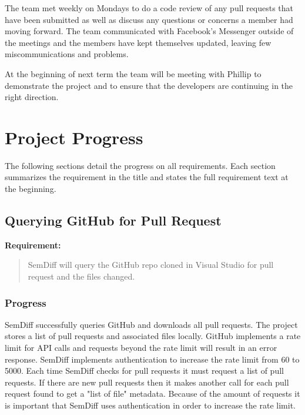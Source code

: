 \documentclass[draftclsnofoot,onecolumn]{IEEEtran}
\begin{document}
The team met weekly on Mondays to do a code review of any pull requests that 
have been submitted as well as discuss any questions or concerns a member had 
moving forward. The team communicated with Facebook's Messenger outside of the 
meetings and the members have kept themselves updated, leaving few 
miscommunications and problems.

At the beginning of next term the team will be meeting with Phillip to 
demonstrate the project and to ensure that the developers are continuing in the 
right direction.

\section{Project Progress}%

The following sections detail the progress on all requirements. Each section 
summarizes the requirement in the title and states the full requirement text at 
the beginning.

\subsection{Querying GitHub for Pull Request}%

\textbf{Requirement:}

\begin{quote}

SemDiff will query the GitHub repo cloned in Visual Studio for pull request 
and the files changed.

\end{quote}

\subsubsection{Progress}

SemDiff successfully queries GitHub and downloads all pull requests. The 
project stores a list of pull requests and associated files locally. GitHub 
implements a rate limit for API calls and requests beyond the rate limit will 
result in an error response. SemDiff implements authentication to increase the 
rate limit from 60 to 5000. Each time SemDiff checks for pull requests it must request a list of pull requests. If there are new pull requests then it makes another call for each pull request found to get a "list of file" metadata. Because of the amount of requests it is important that SemDiff uses authentication in order to increase the rate limit.
\end{document}
